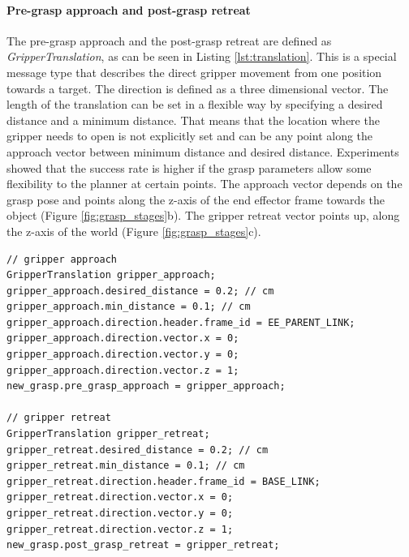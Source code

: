 \paragraph{Pre-grasp approach and post-grasp retreat} The pre-grasp approach and the post-grasp retreat are defined as \emph{GripperTranslation}, as can be seen in Listing \ref{lst:translation}. This is a special message type that describes the direct gripper movement from one position towards a target. The direction is defined as a three dimensional vector. The length of the translation can be set in a flexible way by specifying a desired distance and a minimum distance. That means that the location where the gripper needs to open is not explicitly set and can be any point along the approach vector between minimum distance and desired distance. Experiments showed that the success rate is higher if the grasp parameters allow some flexibility to the planner at certain points. The approach vector depends on the grasp pose and points along the z-axis of the end effector frame towards the object (Figure \ref{fig:grasp_stages}b). The gripper retreat vector points up, along the z-axis of the world (Figure \ref{fig:grasp_stages}c).

\lstset{style=customc}
\begin{minipage}{\linewidth}
\begin{lstlisting}[caption={Definition of gripper translations}, label=lst:translation]
// gripper approach
GripperTranslation gripper_approach;
gripper_approach.desired_distance = 0.2; // cm
gripper_approach.min_distance = 0.1; // cm
gripper_approach.direction.header.frame_id = EE_PARENT_LINK;
gripper_approach.direction.vector.x = 0;
gripper_approach.direction.vector.y = 0;
gripper_approach.direction.vector.z = 1;
new_grasp.pre_grasp_approach = gripper_approach;

// gripper retreat
GripperTranslation gripper_retreat;
gripper_retreat.desired_distance = 0.2; // cm
gripper_retreat.min_distance = 0.1; // cm
gripper_retreat.direction.header.frame_id = BASE_LINK;
gripper_retreat.direction.vector.x = 0;
gripper_retreat.direction.vector.y = 0;
gripper_retreat.direction.vector.z = 1;
new_grasp.post_grasp_retreat = gripper_retreat;
\end{lstlisting}
\end{minipage}

